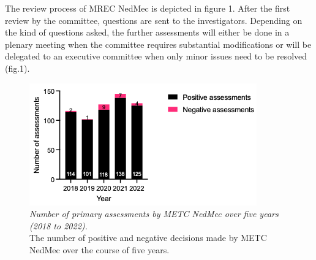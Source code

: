 \documentclass[authordate, meta]{jote-new-article}
\begin{document}
The review process of MREC NedMec is depicted in figure 1. After the first review by the committee, questions are sent to the investigators. Depending on the kind of questions asked, the further assessments will either be done in a plenary meeting when the committee requires substantial modifications or will be delegated to an executive committee when only minor issues need to be resolved (fig.1).

























































\begin{figure}[t!]
  \begin{fullwidth}
    \includegraphics[width=\linewidth]{media/Picture2.png}

    \caption{\emph{Number of primary assessments by METC NedMec over five years (2018 to 2022).}\\
      The number of positive and negative decisions made by METC NedMec over the course of five years.}

    \label{fig:rId12}

  \end{fullwidth}
\end{figure}
\end{document}
